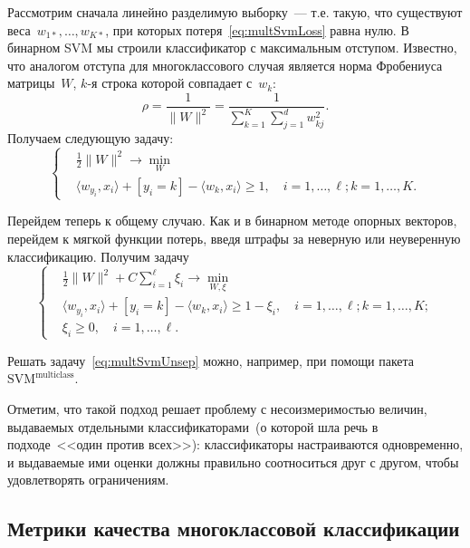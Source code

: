 \documentclass[12pt,fleqn]{article}
\begin{document}
Рассмотрим сначала линейно разделимую выборку~--- т.е. такую,
что существуют веса~$w_{1*}, \dots, w_{K*}$,
при которых потеря~\eqref{eq:multSvmLoss} равна нулю.
В бинарном SVM мы строили классификатор с максимальным отступом.
Известно, что аналогом отступа для многоклассового случая
является норма Фробениуса матрицы~$W$, $k$-я строка которой совпадает с~$w_k$:
\[
    \rho = \frac{1}{\|W\|^2} = \frac{1}{\sum_{k = 1}^{K} \sum_{j = 1}^{d} w_{kj}^2}.
\]
Получаем следующую задачу:
\begin{equation}
\label{eq:multSvmSep}
    \left\{
        \begin{aligned}
            & \frac{1}{2} \|W\|^2 \to \min_{W} \\
            & \langle w_{y_i}, x_i \rangle +
                [y_i = k] -
                \langle w_k, x_i \rangle \geq 1,
                \quad i = 1, \dots, \ell; k = 1, \dots, K.
        \end{aligned}
    \right.
\end{equation}

Перейдем теперь к общему случаю.
Как и в бинарном методе опорных векторов,
перейдем к мягкой функции потерь, введя штрафы за неверную или неуверенную классификацию.
Получим задачу
\begin{equation}
\label{eq:multSvmUnsep}
    \left\{
        \begin{aligned}
            & \frac{1}{2} \|W\|^2 +
                C \sum_{i = 1}^{\ell} \xi_i \to \min_{W, \xi} \\
            & \langle w_{y_i}, x_i \rangle +
                [y_i = k] -
                \langle w_k, x_i \rangle \geq 1 - \xi_i,
                \quad i = 1, \dots, \ell; k = 1, \dots, K; \\
            & \xi_i \geq 0, \quad i = 1, \dots, \ell.
        \end{aligned}
    \right.
\end{equation}

Решать задачу~\eqref{eq:multSvmUnsep} можно, например,
при помощи пакета~$\text{SVM}^\text{multiclass}$.

Отметим, что такой подход решает проблему с несоизмеримостью
величин, выдаваемых отдельными классификаторами~(о которой шла речь
в подходе~<<один против всех>>):
классификаторы настраиваются одновременно, и
выдаваемые ими оценки должны правильно соотноситься друг
с другом, чтобы удовлетворять ограничениям.

\subsection{Метрики качества многоклассовой классификации}
\end{document}
